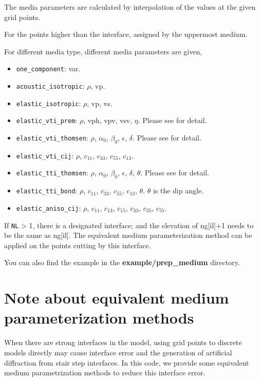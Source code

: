 \begin{itemize}
The media parameters are calculated by interpolation of the values at the given grid points.

For the points higher than the interface, assigned by the uppermost medium. 

For different media type, different media parameters are given,
\begin{itemize}
  \item \texttt{one\_component}: var.

  \item \texttt{acoustic\_isotropic}: $\rho$, vp.

  \item \texttt{elastic\_isotropic}: $\rho$, vp, vs.

  \item \texttt{elastic\_vti\_prem}: $\rho$, vph, vpv, vsv, $\eta$. Please see \citep{dziewonski1981preliminary} for detail.

  \item \texttt{elastic\_vti\_thomsen}: $\rho$, $\alpha_0$, $\beta_0$, $\epsilon$, $\delta$. Please see \citep{thomsen1986weak} for detail.

  \item \texttt{elastic\_vti\_cij}: $\rho$, $c_{11}$, $c_{33}$, $c_{55}$, $c_{13}$. 

  \item \texttt{elastic\_tti\_thomsen}: $\rho$, $\alpha_0$, $\beta_0$, $\epsilon$, $\delta$, $\theta$. Please see \citep{thomsen1986weak} for detail.

  \item \texttt{elastic\_tti\_bond}: $\rho$, $c_{11}$, $c_{33}$, $c_{55}$, $c_{13}$, $\theta$. $\theta$ is the dip angle.

  \item \texttt{elastic\_aniso\_cij}: $\rho$, $c_{11}$, $c_{13}$, $c_{15}$, $c_{33}$, $c_{35}$, $c_{55}$.
\end{itemize}

\end{itemize}

If \texttt{NL} > 1, there is a designated interface; and the elevation of ng[il]+1 needs to be the same as ng[il]. The equivalent medium parameterization method can be applied on the points cutting by this interface.

You can also find the example in the \textbf{example/prep\_medium} directory.

\section{Note about equivalent medium parameterization methods} \label{equivalent_method} 
When there are strong interfaces in the model, using grid points to discrete models directly may cause interface error and the generation of artificial diffraction from stair step interfaces. In this code, we provide some equivalent medium parametrization methods to reduce this interface error.

